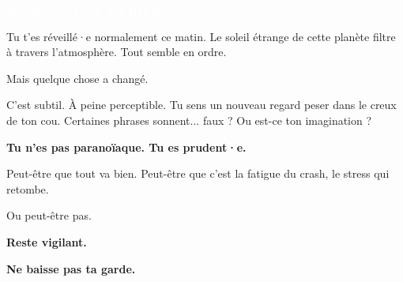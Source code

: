 \documentclass[a4paper,10pt]{article}
\newcommand{\fichenonparasite}[1]{
\colorbox{safecolor}{\textcolor{white}{\textbf{#1}}}
}
\begin{document}
\hfill
\begin{minipage}[t]{0.48\textwidth}
\raggedright
\fichenonparasite{JOUR 3 - TOUT VA BIEN...}

\vspace{0.3cm}

Tu t'es réveillé·e normalement ce matin. Le soleil étrange de cette planète filtre à travers l'atmosphère. Tout semble en ordre.

\vspace{0.2cm}

Mais quelque chose a changé.

\vspace{0.2cm}

C'est subtil. À peine perceptible. Tu sens un nouveau regard peser dans le creux de ton cou. Certaines phrases sonnent... faux ? Ou est-ce ton imagination ?

\vspace{0.2cm}

\textbf{Tu n'es pas paranoïaque. Tu es prudent·e.}

\vspace{0.2cm}

Peut-être que tout va bien. Peut-être que c'est la fatigue du crash, le stress qui retombe.

\vspace{0.2cm}

Ou peut-être pas.

\vspace{0.2cm}

\textbf{Reste vigilant.}

\vspace{0.2cm}

\textbf{Ne baisse pas ta garde.}
\end{minipage}

\newpage
\end{document}
